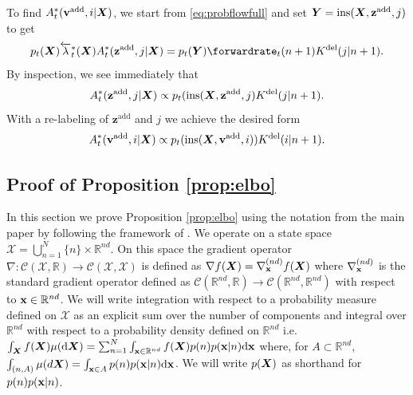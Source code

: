 \newcommand{\zadd}{\mathbf{z}^{\text{add}}}
To find $A_t^*({\mathbf{v}}^{\textup{add}}, i | {\bm{X}})$, we start from \eqref{eq:probflowfull} and set $\mY = \text{ins}(\mX, \zadd, j)$ to get
\begin{equation}
    p_t(\mX) \backwardrate_t^*(\mX) \autonet_t^*(\zadd, j | \mX) = p_t(\mY) \forwardrate_t(n+1) \delidxdist(j | n+1) .
\end{equation}
By inspection, we see immediately that
\begin{equation}
    \autonet_t^*(\zadd, j | \mX) \propto p_t(\text{ins}(\mX, \zadd, j) \delidxdist(j | n+1) . 
\end{equation}
With a re-labeling of $\zadd$ and $j$ we achieve the desired form
\begin{equation}
    A_t^*({\mathbf{v}}^{\textup{add}}, i | {\bm{X}}) \propto p_t(\text{ins}({\bm{X}}, {\mathbf{v}}^{\textup{add}}, i)) K^{\textup{del}}(i | n+1) .
\end{equation}

\subsection{Proof of Proposition \ref{prop:elbo}}
\label{sec:tddm-proof_elbo}

\newcommand{\adjointK}{\hat{\mathcal{K}}^*}
\newcommand{\K}{\hat{\mathcal{K}}}
\newcommand{\mrate}{\lambda^M}
\newcommand{\mdrift}{\mathbf{b}^M}
\newcommand{\inty}{\sum_{m=1}^N \int_{\y \in \mathbb{R}^{md}}}
\newcommand{\intyNont}{\sum_{m=1 \backslash n_t}^N \int_{\y \in \mathbb{R}^{md}}}
\newcommand{\intx}{\sum_{n=1}^N \int_{\rvx \in \mathbb{R}^{nd}}}
\newcommand{\mtk}{K^{M}}
\newcommand{\Ldiff}{ \hat{\mathcal{L}}^{\text{diff}}  }
\newcommand{\LJ}{\hat{\mathcal{L}}^{\text{J}} }
\newcommand{\aLJ}{\hat{\mathcal{L}}^{\text{J}*  } }

In this section we prove Proposition \ref{prop:elbo} using the notation from the main paper by following the framework of \cite{benton2022denoising}.  We operate on a state
space $\mathcal{X} = \bigcup_{n=1}^N \{n\} \times \mathbb{R}^{nd}$.  On this
space the gradient operator
$\nabla: \mathcal{C}(\mathcal{X}, \mathbb{R}) \rightarrow
\mathcal{C}(\mathcal{X}, \mathcal{X})$ is defined as
$\nabla f({\bm{X}}) = \nabla^{(nd)}_{{\mathbf{x}}} f({\bm{X}})$ where $\nabla^{(nd)}_{{\mathbf{x}}}$ is the
standard gradient operator defined as
$\mathcal{C}(\mathbb{R}^{nd}, \mathbb{R}) \rightarrow
\mathcal{C}(\mathbb{R}^{nd}, \mathbb{R}^{nd})$ with respect to
${\mathbf{x}} \in \mathbb{R}^{nd}$. We will write integration with respect to a
probability measure defined on $\mathcal{X}$ as an explicit sum over the number
of components and integral over $\mathbb{R}^{nd}$ with respect to a probability
density defined on $\mathbb{R}^{nd}$ i.e.
$\int_{{\bm{X}}} f({\bm{X}}) \mu(\mathrm{d} {\bm{X}}) = \sum_{n=1}^N \int_{{\mathbf{x}} \in \mathbb{R}^{nd}} f({\bm{X}})
p(n)p({\mathbf{x}} | n) \mathrm{d} {\mathbf{x}} $ where, for $A \subset \mathbb{R}^{nd}$,
$\int_{(n, A)} \mu(d{\bm{X}}) = \int_{{\mathbf{x}} \in A} p(n)p({\mathbf{x}} | n) \mathrm{d} {\mathbf{x}}$. We will write
$p({\bm{X}})$ as shorthand for $p(n)p({\mathbf{x}} | n)$.

